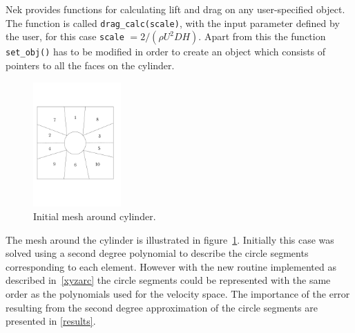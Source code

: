 Nek provides functions for calculating lift and drag on any user-specified object.
The function is called \verb|drag_calc(scale)|, with the input parameter 
defined by the user, for this case \verb|scale| $=2/(\rho U^2DH)$.  
Apart from this the function \verb|set_obj()| has to be modified in order to create an object 
which consists of pointers to all the faces on the cylinder.
%
\begin{figure}[h]
    \centering
    \includegraphics[width = 0.3\textwidth]{Figures/cyl_elem.pdf}
    \caption{Initial mesh around cylinder.}
    \label{fig:cyl_elem}
\end{figure}
%
The mesh around the cylinder is illustrated in figure~\ref{fig:cyl_elem}.
Initially this case was solved using a second degree polynomial to describe the circle segments
corresponding to each element. However with the new routine implemented as described 
in~\ref{xyzarc} the circle segments could be represented with the same order as 
the polynomials used for the velocity space. The importance of the error resulting 
from the second degree approximation of the circle segments are presented in \cref{results}.

